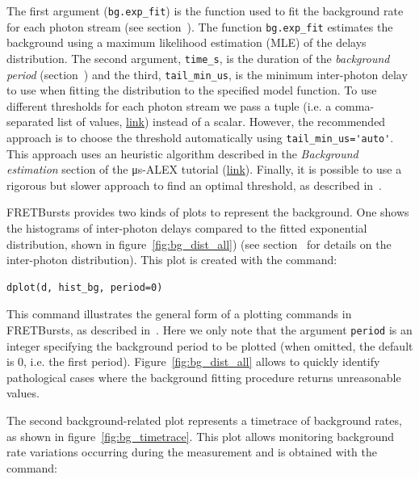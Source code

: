 \documentclass[10pt,letterpaper]{article}
\begin{document}
The first argument (\verb|bg.exp_fit|) is the function used to fit the
background rate for each photon stream (see section~).
The function
\verb|bg.exp_fit| estimates the background using a maximum likelihood estimation
(MLE) of the delays distribution.
The second argument, \verb|time_s|, is the duration of the
\textit{background period} (section~) and the third, \verb|tail_min_us|,
is the minimum inter-photon delay to use when fitting the distribution to the specified model function.
To use different thresholds for each photon stream we pass a
tuple (i.e. a comma-separated list of values, \href{https://docs.python.org/3.5/tutorial/datastructures.html#tuples-and-sequences}{link}) instead of a scalar.
However, the recommended approach is to choose the threshold automatically using
\verb|tail_min_us='auto'|. This approach uses an heuristic algorithm described in the
\textit{Background estimation} section of the μs-ALEX tutorial
(\href{http://nbviewer.jupyter.org/github/tritemio/FRETBursts_notebooks/blob/master/notebooks/FRETBursts%20-%20us-ALEX%20smFRET%20burst%20analysis.ipynb#Background-estimation}{link}).
Finally, it is possible to use a rigorous but slower approach to find an optimal
threshold, as described in~. %

FRETBursts provides two kinds of plots to represent the background. One shows the histograms
of inter-photon delays compared to the fitted exponential distribution, shown in
figure~\ref{fig:bg_dist_all}) (see section~ for details on the inter-photon distribution).
This plot is created with the command:

\begin{lstlisting}
dplot(d, hist_bg, period=0)
\end{lstlisting}

This command illustrates the general form of a plotting commands in FRETBursts,
as described in~. %
Here we only note that the argument \verb|period| is an integer specifying the background
period to be plotted (when omitted, the default is 0, i.e. the first period).
Figure~\ref{fig:bg_dist_all} allows to quickly identify pathological cases where the
background fitting procedure returns unreasonable values.

The second background-related plot represents a timetrace of background rates,
as shown in figure~\ref{fig:bg_timetrace}. This plot allows monitoring background rate variations
occurring during the measurement and is obtained with the command:
\end{document}
